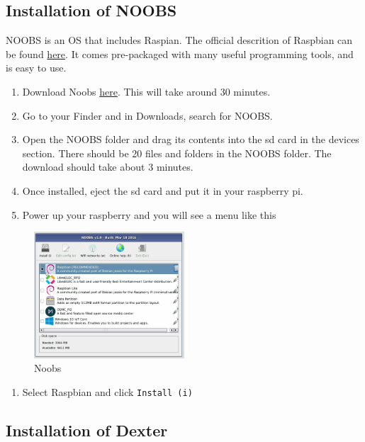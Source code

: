 \subsection{Installation of NOOBS}\label{installation-of-noobs}

NOOBS is an OS that includes Raspian. The official descrition of
Raspbian can be found
\href{https://www.raspberrypi.org/downloads/raspbian/}{here}. It comes
pre-packaged with many useful programming tools, and is easy to use.

\begin{enumerate}
\def\labelenumi{\arabic{enumi}.}
\tightlist
\item
  Download Noobs
  \href{https://www.raspberrypi.org/downloads/noobs/}{here}. This will
  take around 30 minutes.
\item
  Go to your Finder and in Downloads, search for NOOBS.
\item
  Open the NOOBS folder and drag its contents into the sd card in the
  devices section. There should be 20 files and folders in the NOOBS
  folder. The download should take about 3 minutes.
\item
  Once installed, eject the sd card and put it in your raspberry pi.
\item
  Power up your raspberry and you will see a menu like this
\end{enumerate}

\begin{figure}[htb]
\centering
\includegraphics[width=0.5\textwidth]{images/noobs.jpg}
\caption{Noobs}
\end{figure}

\begin{enumerate}
\def\labelenumi{\arabic{enumi}.}
\setcounter{enumi}{5}
\tightlist
\item
  Select Raspbian and click \texttt{Install\ (i)}
\end{enumerate}

\subsection{Installation of Dexter}\label{installation-of-dexter}


